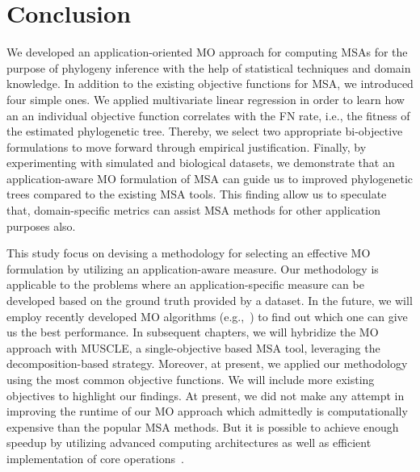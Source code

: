  \section{Conclusion} \label{sec:discussion}
We developed an application-oriented MO approach for computing MSAs for the purpose of phylogeny inference with the help of statistical techniques and domain knowledge. In addition to the existing objective functions for MSA, we introduced four simple ones. 
We applied multivariate linear regression in order to learn how an an individual objective function correlates with the FN rate, i.e., the fitness of the estimated phylogenetic tree. Thereby, we select two appropriate bi-objective formulations to move forward through empirical justification. Finally, by experimenting with simulated and biological datasets, we demonstrate that an application-aware MO formulation of MSA can guide us to improved phylogenetic trees compared to the existing MSA tools. This finding allow us to speculate that, domain-specific metrics can assist MSA methods for other application purposes also. 

This study focus on devising a methodology for selecting an effective MO formulation by utilizing an application-aware measure.  Our methodology is applicable to the problems where an application-specific measure can be developed based on the ground truth provided by a dataset. In the future, we will employ recently developed MO algorithms (e.g.,~\cite{8981871, 9047876, 9097242}) to find out which one can give us the best performance. In subsequent chapters, we will hybridize the MO approach with MUSCLE, a single-objective based MSA tool, leveraging the decomposition-based strategy. Moreover, at present, we applied our methodology using the most common objective functions. We will include more existing objectives to highlight our findings. 
At present, we did not make any attempt in improving the runtime of our MO approach which admittedly is computationally expensive than the popular MSA methods. But it is possible to achieve enough speedup by utilizing advanced computing architectures as well as efficient implementation of core operations~\cite{8255834, 7738460}.  


